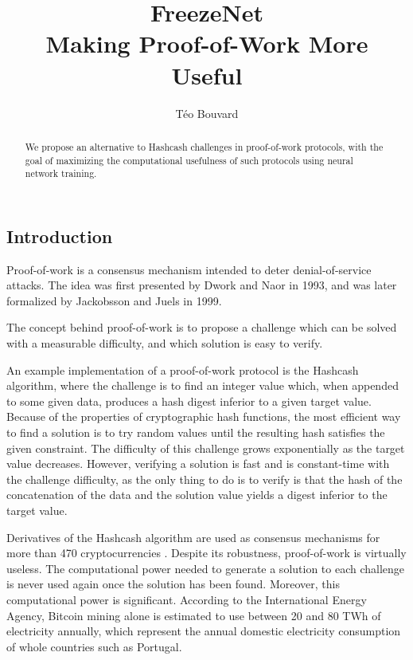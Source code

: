 \documentclass{article}
\title{
FreezeNet \\
Making Proof-of-Work More Useful
}
\author{Téo Bouvard}
\date{}
\begin{document}
\maketitle

\begin{abstract}
	We propose an alternative to Hashcash challenges in proof-of-work protocols, with the goal of maximizing the computational usefulness of such protocols using neural network training.
\end{abstract}

\begin{multicols}{2}

	\section{Introduction}
	Proof-of-work is a consensus mechanism intended to deter denial-of-service attacks. The idea was first presented by Dwork and Naor\cite{Dwork93} in 1993, and was later formalized by Jackobsson and Juels\cite{Jakobsson99} in 1999.

	The concept behind proof-of-work is to propose a challenge which can be solved with a measurable difficulty, and which solution is easy to verify.

	An example implementation of a proof-of-work protocol is the Hashcash algorithm\cite{back02hashcash}, where the challenge is to find an integer value which, when appended to some given data, produces a hash digest inferior to a given target value. Because of the properties of cryptographic hash functions, the most efficient way to find a solution is to try random values until the resulting hash satisfies the given constraint. The difficulty of this challenge grows exponentially as the target value decreases. However, verifying a solution is fast and is constant-time with the challenge difficulty, as the only thing to do is to verify is that the hash of the concatenation of the data and the solution value yields a digest inferior to the target value.

	Derivatives of the Hashcash algorithm are used as consensus mechanisms for more than 470 cryptocurrencies \cite{cryptoslate20}. Despite its robustness, proof-of-work is virtually useless. The computational power needed to generate a solution to each challenge is never used again once the solution has been found. Moreover, this computational power is significant. According to the International Energy Agency\cite{ieabtcenergy20}, Bitcoin mining alone is estimated to use between 20 and 80 TWh of electricity annually, which represent the annual domestic electricity consumption of whole countries such as Portugal\cite{enerdata}.


\end{multicols}
\end{document}
